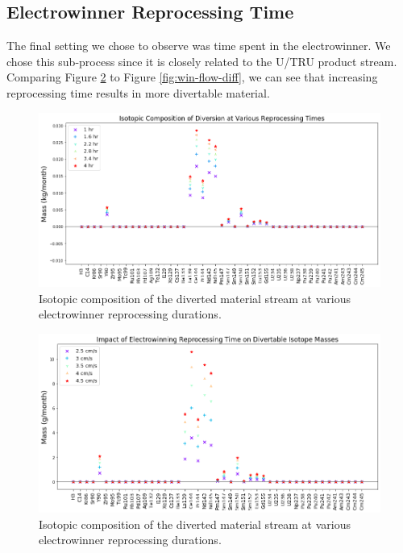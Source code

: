 \subsection{Electrowinner Reprocessing Time}

The final setting we chose to observe was time spent in the electrowinner. We chose this sub-process since it is closely related to the U/TRU product stream. Comparing Figure \ref{fig:win-time-diff} to Figure \ref{fig:win-flow-diff}, we can see that increasing 
reprocessing time results in more divertable material. 

\begin{figure}
	\includegraphics[width=\linewidth]{images/time-sa-comp}
	\caption{Isotopic composition of the diverted material stream at various electrowinner reprocessing durations.}
	\label{fig:win-time-sa}
\end{figure}

\begin{figure}
	\includegraphics[width=\linewidth]{images/time-sa-diff}
	\caption{Isotopic composition of the diverted material stream at various electrowinner reprocessing durations.}
	\label{fig:win-time-diff}
\end{figure}

